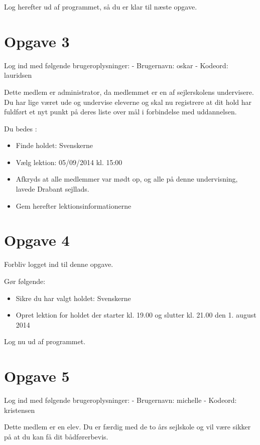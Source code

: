 Log herefter ud af programmet, så du er klar til næste opgave.
 
\section{Opgave 3}

Log ind med følgende brugeroplysninger: 
\newline - Brugernavn: oskar
\newline - Kodeord: lauridsen

Dette medlem er administrator, da medlemmet er en af sejlerskolens undervisere.
Du har lige været ude og undervise eleverne og skal nu registrere at dit hold har fuldført et nyt punkt på deres liste over mål i forbindelse med uddannelsen.

Du bedes :

\begin{itemize}
\item Finde holdet: Svenskerne
\item Vælg lektion: 05/09/2014 kl. 15:00 
\item Afkryds at alle medlemmer var mødt op, og alle på denne undervisning, lavede Drabant sejllads.
\item Gem herefter lektionsinformationerne
\end{itemize}


\section{Opgave 4}

Forbliv logget ind til denne opgave.

Gør følgende:
\begin{itemize}
\item Sikre du har valgt holdet: Svenskerne
\item Opret lektion for holdet der starter kl. 19.00 og slutter kl. 21.00 den 1. august 2014
\end{itemize}

Log nu ud af programmet.

\section{Opgave 5}

Log ind med følgende brugeroplysninger: 
\newline - Brugernavn: michelle
\newline - Kodeord: kristensen

Dette medlem er en elev. Du er færdig med de to års sejlskole og vil være sikker på at du kan få dit bådførerbevis.

